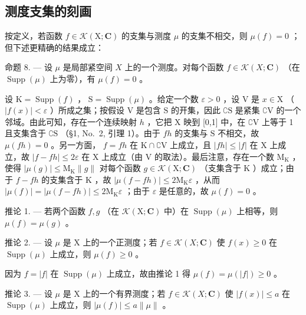 \subsection{测度支集的刻画}

按定义，若函数 \(f \in \mathcal{K}(\mathrm{X};\mathbf{C})\) 的支集与测度 \(\mu\) 的支集不相交，则 \(\mu(f) = 0\) ；但下述更精确的结果成立：

命题 8. --- 设 \(\mu\) 是局部紧空间 \(X\) 上的一个测度。对每个函数 \(f \in \mathcal{K}(X; \mathbf{C})\) （在 \(\operatorname{Supp}(\mu)\) 上为零），有 \(\mu(f) = 0\) 。

设 \(\mathrm{K} = \operatorname{Supp}(f)\) ， \(\mathrm{S} = \operatorname{Supp}(\mu)\) 。给定一个数 \(\varepsilon > 0\) ，设 \(\mathrm{V}\) 是 \(x \in \mathrm{X}\) （\(|f(x)| < \varepsilon\) ）所成之集；按假设 \(\mathrm{V}\) 是包含 \(\mathrm{S}\) 的开集，因此 \(\complement \mathrm{S}\) 是紧集 \(\complement \mathrm{V}\) 的一个邻域。由此可知，存在一个连续映射 \(h\) ，它把 \(\mathrm{X}\) 映到 {[}0,1{]} 中，在 \(\complement \mathrm{V}\) 上等于 1 且支集含于 \(\complement \mathrm{S}\) （§1, No.~2, 引理 1）。由于 \(fh\) 的支集与 \(\mathrm{S}\) 不相交，故 \(\mu(fh) = 0\) 。另一方面， \(f = fh\) 在 \(\mathrm{K} \cap \complement \mathrm{V}\) 上成立，且 \(|fh| \leqslant |f|\) 在 \(\mathrm{X}\) 上成立，故 \(|f - fh| \leqslant 2\varepsilon\) 在 \(\mathrm{X}\) 上成立（由 \(\mathrm{V}\) 的取法）。最后注意，存在一个数 \(\mathrm{M}_{\mathrm{K}}\) ，使得 \(|\mu(g)| \leqslant \mathrm{M}_{\mathrm{K}} \| g\|\) 对每个函数 \(g \in \mathcal{K}(\mathrm{X};\mathbf{C})\) （支集含于 \(\mathrm{K}\) ）成立；由于 \(f - fh\) 的支集含于 \(\mathrm{K}\) ，故 \(|\mu(f - fh)| \leqslant 2\mathrm{M}_{\mathrm{K}}\varepsilon\) ，从而 \(|\mu(f)| = |\mu(f - fh)| \leqslant 2\mathrm{M}_{\mathrm{K}}\varepsilon\) ；由于 \(\varepsilon\) 是任意的，故 \(\mu(f) = 0\) 。

推论 1. --- 若两个函数 \(f, g\) （在 \(\mathcal{K}(\mathrm{X};\mathbf{C})\) 中）在 \(\operatorname{Supp}(\mu)\) 上相等，则 \(\mu(f) = \mu(g)\) 。

推论 2. --- 设 \(\mu\) 是 X 上的一个正测度；若 \(f \in \mathcal{K}(X; \mathbf{C})\) 使 \(f(x) \geqslant 0\) 在 \(\operatorname{Supp}(\mu)\) 上成立，则 \(\mu(f) \geqslant 0\) 。

因为 \(f = |f|\) 在 \(\operatorname{Supp}(\mu)\) 上成立，故由推论 1 得 \(\mu(f) = \mu(|f|) \geqslant 0\) 。

推论 3. --- 设 \(\mu\) 是 X 上的一个有界测度；若 \(f \in \mathcal{K}(X; \mathbf{C})\) 使 \(|f(x)| \leqslant a\) 在 \(\operatorname{Supp}(\mu)\) 上成立，则 \(|\mu(f)| \leqslant a \| \mu \|\) 。

